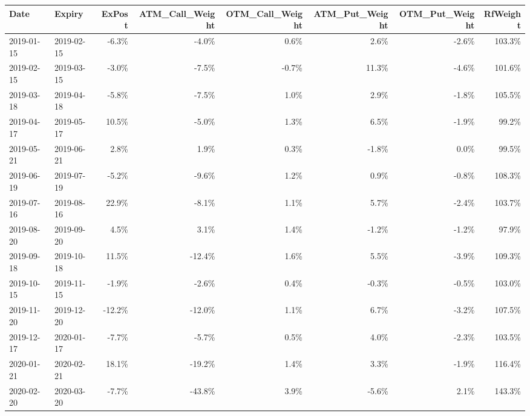 \begin{tabular}{llrrrrrr}
\hline
 Date       & Expiry     &   ExPost &   ATM\_Call\_Weight &   OTM\_Call\_Weight &   ATM\_Put\_Weight &   OTM\_Put\_Weight &   RfWeight \\
\hline
 2019-01-15 & 2019-02-15 &    -6.3\% &             -4.0\% &              0.6\% &             2.6\% &            -2.6\% &     103.3\% \\
 2019-02-15 & 2019-03-15 &    -3.0\% &             -7.5\% &             -0.7\% &            11.3\% &            -4.6\% &     101.6\% \\
 2019-03-18 & 2019-04-18 &    -5.8\% &             -7.5\% &              1.0\% &             2.9\% &            -1.8\% &     105.5\% \\
 2019-04-17 & 2019-05-17 &    10.5\% &             -5.0\% &              1.3\% &             6.5\% &            -1.9\% &      99.2\% \\
 2019-05-21 & 2019-06-21 &     2.8\% &              1.9\% &              0.3\% &            -1.8\% &             0.0\% &      99.5\% \\
 2019-06-19 & 2019-07-19 &    -5.2\% &             -9.6\% &              1.2\% &             0.9\% &            -0.8\% &     108.3\% \\
 2019-07-16 & 2019-08-16 &    22.9\% &             -8.1\% &              1.1\% &             5.7\% &            -2.4\% &     103.7\% \\
 2019-08-20 & 2019-09-20 &     4.5\% &              3.1\% &              1.4\% &            -1.2\% &            -1.2\% &      97.9\% \\
 2019-09-18 & 2019-10-18 &    11.5\% &            -12.4\% &              1.6\% &             5.5\% &            -3.9\% &     109.3\% \\
 2019-10-15 & 2019-11-15 &    -1.9\% &             -2.6\% &              0.4\% &            -0.3\% &            -0.5\% &     103.0\% \\
 2019-11-20 & 2019-12-20 &   -12.2\% &            -12.0\% &              1.1\% &             6.7\% &            -3.2\% &     107.5\% \\
 2019-12-17 & 2020-01-17 &    -7.7\% &             -5.7\% &              0.5\% &             4.0\% &            -2.3\% &     103.5\% \\
 2020-01-21 & 2020-02-21 &    18.1\% &            -19.2\% &              1.4\% &             3.3\% &            -1.9\% &     116.4\% \\
 2020-02-20 & 2020-03-20 &    -7.7\% &            -43.8\% &              3.9\% &            -5.6\% &             2.1\% &     143.3\% \\

\end{tabular}
